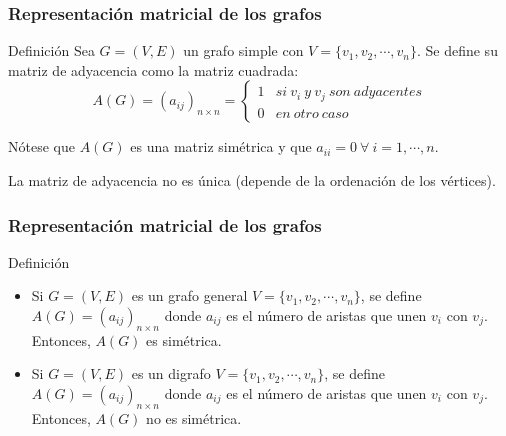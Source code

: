 \documentclass{beamer}
\begin{document}
\begin{frame}
\frametitle{Representaci\'on matricial de los grafos}
\begin{block}{Definici\'on}
Sea $G=(V,E)$ un grafo simple con $V=\{v_1,v_2,\cdots,v_n\}$. Se define su matriz de adyacencia como la matriz cuadrada:
\[A(G) = (a_{ij})_{n\times n} = \left\{\begin{array}{ll}1 & si\ v_i\ y\ v_j\ son\ adyacentes \\0 & en\ otro\ caso\end{array}\right.\]

\end{block}
N\'otese que $A(G)$ es una matriz sim\'etrica y que $a_{ii} = 0\ \forall\ i=1,\cdots,n$.

La matriz de adyacencia no es \'unica (depende de la ordenaci\'on de los v\'ertices). 
\end{frame}


\begin{frame}
\frametitle{Representaci\'on matricial de los grafos}
\begin{block}{Definici\'on}
\begin{itemize}
\item Si $G=(V,E)$ es un grafo general $V=\{v_1,v_2,\cdots,v_n\}$, se define $A(G) = (a_{ij})_{n\times n}$ donde $a_{ij}$ es el n\'umero de aristas que unen $v_i$ con $v_j$. Entonces, $A(G)$ es sim\'etrica.
\item Si $G=(V,E)$ es un digrafo $V=\{v_1,v_2,\cdots,v_n\}$, se define $A(G) = (a_{ij})_{n\times n}$ donde $a_{ij}$ es el n\'umero de aristas que unen $v_i$ con $v_j$. Entonces, $A(G)$ no es sim\'etrica.

\end{itemize}
\end{block}
\end{frame}
\end{document}
